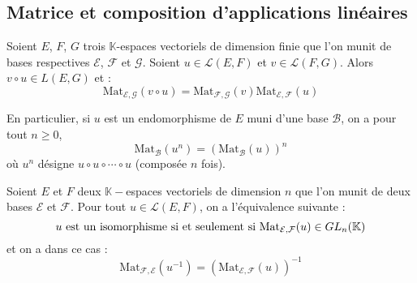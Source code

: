 \documentclass[a4paper,10pt]{report}
\begin{document}
%
%
\subsection{Matrice et composition d'applications linéaires}

\begin{Proposition}{}
Soient $E$, $F$, $G$ trois $\mathbb{K}$-espaces vectoriels de dimension finie que l'on munit de bases respectives $\mathcal{E}$, $\mathcal{F}$ et $\mathcal{G}$. Soient $u \in \mathcal{L}(E,F)$ et $v \in \mathcal{L}(F,G)$. Alors $v \circ u \in L(E,G)$ et :
$$ \textrm{Mat}_{\mathcal{E}, \mathcal{G}}(v \circ u) = \textrm{Mat}_{\mathcal{F}, \mathcal{G}}(v ) \textrm{Mat}_{\mathcal{E}, \mathcal{F}}( u)$$
\end{Proposition}

\begin{Remarque}{} En particulier, si $u$ est un endomorphisme de $E$ muni d'une base $\mathcal{B}$, on a pour tout $n \geq 0$,
$$ \textrm{Mat}_{\mathcal{B}}(u^n) = \left(\textrm{Mat}_{\mathcal{B}}(u)\right)^n$$
où $u^n$ désigne $u \circ u \circ \cdots \circ u$ (composée $n$ fois).
\end{Remarque}

\begin{Corollaire}{} Soient $E$ et $F$ deux $\mathbb{K}-$espaces vectoriels  de dimension $n$ que l'on munit de deux bases $\mathcal{E}$ et $\mathcal{F}$. Pour tout $u \in \mathcal{L}(E,F)$, on a l'équivalence suivante :
$$ u \hbox{ est un isomorphisme si et seulement si } \textrm{Mat}_{\mathcal{E}, \mathcal{F}}(u) \in GL_n (\mathbb{K})$$
et on a dans ce cas :
$$ \textrm{Mat}_{\mathcal{F}, \mathcal{E}}(u^{-1}) = \left( \textrm{Mat}_{\mathcal{E}, \mathcal{F}}(u) \right)^{-1}$$
\end{Corollaire}
\end{document}
